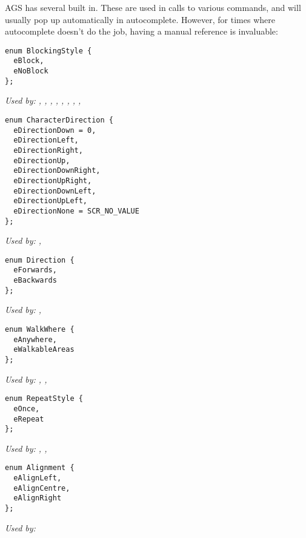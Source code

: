AGS has several  built in. These are used in calls to
various commands, and will usually pop up automatically in autocomplete. However, for times
where autocomplete doesn't do the job, having a manual reference is invaluable:

\begin{verbatim}
enum BlockingStyle {
  eBlock,
  eNoBlock
};
\end{verbatim}
\it{Used by:} ,
,
,
,
,
,
,
,

\begin{verbatim}
enum CharacterDirection {
  eDirectionDown = 0,
  eDirectionLeft,
  eDirectionRight,
  eDirectionUp,
  eDirectionDownRight,
  eDirectionUpRight,
  eDirectionDownLeft,
  eDirectionUpLeft,
  eDirectionNone = SCR_NO_VALUE
};
\end{verbatim}
\it{Used by:} ,

\begin{verbatim}
enum Direction {
  eForwards,
  eBackwards
};
\end{verbatim}
\it{Used by:} ,

\begin{verbatim}
enum WalkWhere {
  eAnywhere,
  eWalkableAreas
};
\end{verbatim}
\it{Used by:} ,
,

\begin{verbatim}
enum RepeatStyle {
  eOnce,
  eRepeat
};
\end{verbatim}
\it{Used by:} ,
,

\begin{verbatim}
enum Alignment {
  eAlignLeft,
  eAlignCentre,
  eAlignRight
};
\end{verbatim}
\it{Used by:} 

